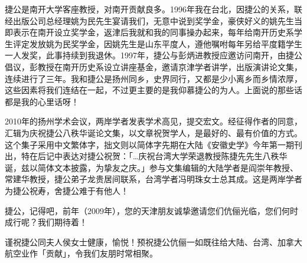 捷公是南开大学客座教授，对南开贡献良多。1996年我在台北，因捷公的关系，联经出版公司总经理姚为民先生宴请我们，无意中说到奖学金，豪侠好义的姚先生当即表示在南开设立奖学金，返津后我就和我的同事操办起来，每年给南开历史系学生评定发放姚为民奖学金，因姚先生是山东平度人，遵他嘱咐每年另给平度籍学生一人发奖，此事持续到我退休。1997年，捷公与彭炳进教授应邀访问南开，由捷公倡议，彭教授在南开历史系设立讲座基金，邀请京津学者讲学，出版演讲论文集，连续进行了三年。我和捷公是扬州同乡，史界同行，又都是少小离乡而乡情浓厚，这些因素将我们连结在一起，不过更主要的是我仰慕捷公的为人。上面说的那些话都是我的心里话呀！

2010年的扬州学术会议，两岸学者发表学术高见，提交宏文。经征得作者的同意，汇辑为庆祝捷公八秩华诞论文集，以文章祝贺学人，是最好的、最有价值的方式。这个集子采用中文繁体字，拙文则以简体字先期在大陆《安徽史学》今年第一期刊出，特在后记中表达对捷公祝贺：「…庆祝台湾大学荣退教授陈捷先先生八秩华诞，兹以简体文本披露，为挚友之庆。」参与文集编辑的大陆学者是阎崇年教授、常建华教授，捷公弟子龙贵居间联系，台湾学者冯明珠女士总其成。这是两岸学者为捷公祝寿，舍捷公难于有他人！

捷公，记得吧，前年（2009年），您的天津朋友诚挚邀请您们伉俪光临，您们何时成行呢？我们期待着！

谨祝捷公同夫人侯女士健康，愉悦！预祝捷公伉俪一如既往给大陆、台湾、加拿大航空业作「贡献」，令我们友朋时常相聚。

